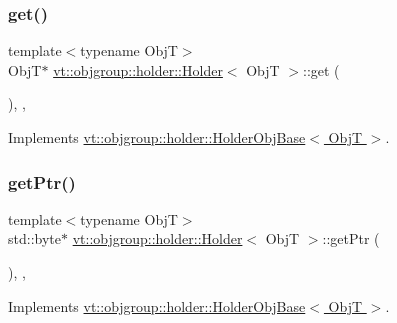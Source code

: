 \subsubsection{\texorpdfstring{get()}{get()}}
{\footnotesize\ttfamily template$<$typename ObjT$>$ \\
ObjT$\ast$ \hyperlink{structvt_1_1objgroup_1_1holder_1_1_holder}{vt\+::objgroup\+::holder\+::\+Holder}$<$ ObjT $>$\+::get (\begin{DoxyParamCaption}{ }\end{DoxyParamCaption})\hspace{0.3cm}{\ttfamily [inline]}, {\ttfamily [override]}, {\ttfamily [virtual]}}



Implements \hyperlink{structvt_1_1objgroup_1_1holder_1_1_holder_obj_base_a4b350b0126259d31a62fd426a08f6698}{vt\+::objgroup\+::holder\+::\+Holder\+Obj\+Base$<$ Obj\+T $>$}.

\mbox{\label{structvt_1_1objgroup_1_1holder_1_1_holder_a421058daef664fb76d90439aef1aaea5}} 
\subsubsection{\texorpdfstring{get\+Ptr()}{getPtr()}}
{\footnotesize\ttfamily template$<$typename ObjT$>$ \\
std\+::byte$\ast$ \hyperlink{structvt_1_1objgroup_1_1holder_1_1_holder}{vt\+::objgroup\+::holder\+::\+Holder}$<$ ObjT $>$\+::get\+Ptr (\begin{DoxyParamCaption}{ }\end{DoxyParamCaption})\hspace{0.3cm}{\ttfamily [inline]}, {\ttfamily [override]}, {\ttfamily [virtual]}}



Implements \hyperlink{structvt_1_1objgroup_1_1holder_1_1_holder_obj_base_abd46e1aa84c0fea2554bf19029581e01}{vt\+::objgroup\+::holder\+::\+Holder\+Obj\+Base$<$ Obj\+T $>$}.

\mbox{\label{structvt_1_1objgroup_1_1holder_1_1_holder_a4ce99c48b611a65189a6891c780b6500}} 
